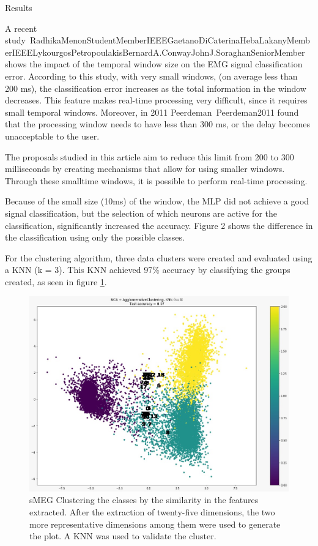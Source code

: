 \documentclass[a4paper, 12pt]{ppgeb}
\makeatletter
\renewcommand{\section}{\@startsection
{section}
{1}
{0mm}
{-\baselineskip}
{0.5\baselineskip}
{\large\bfseries\scshape}}
\makeatother
\begin{document}
\section{Results}

A recent study~\cite{mainreferences}{RadhikaMenonStudentMemberIEEEGaetanoDiCaterinaHebaLakanyMemberIEEELykourgosPetropoulakisBernardA.ConwayJohnJ.SoraghanSeniorMember} shows the impact of the temporal window size on the EMG signal classification error. According to this study, with very small windows, (on average less than 200 ms), the classification error increases as the total information in the window decreases. This feature makes real-time processing very difficult, since it requires small temporal windows. Moreover, in 2011 Peerdeman~\cite{mainreferences}{Peerdeman2011} found that the processing window needs to have less than 300 ms, or the delay becomes unacceptable to the user.

The proposals studied in this article aim to reduce this limit from 200 to 300 milliseconds by creating mechanisms that allow for using smaller windows. Through these smalltime windows, it is possible to perform real-time processing.

Because of the small size (10ms) of the window, the MLP did not achieve a good signal classification, but the selection of which neurons are active for the classification, significantly increased the accuracy. Figure 2 shows the difference in the classification using only the possible classes.

For the clustering algorithm, three data clusters were created and evaluated using a \ac{KNN} (k = 3). This \ac{KNN} achieved 97\% accuracy by classifying the groups created, as seen in figure \ref{fig_sMEG_Clustering}.

\begin{figure}[h]
	\includegraphics[width=\linewidth]{sMEG_Clustering.png}
	\caption{\ac{sMEG} Clustering the classes by the similarity in the features extracted. After the extraction of twenty-five dimensions, the two more representative dimensions among them were used to generate the plot. A \ac{KNN} was used to validate the cluster.} \label{fig_sMEG_Clustering}
\end{figure}
\end{document}
